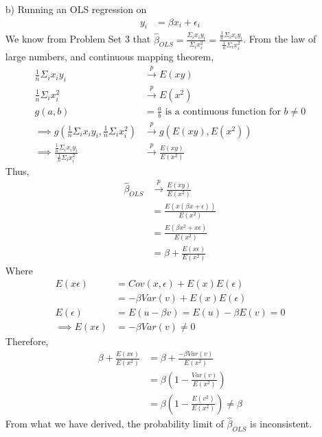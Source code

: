 \documentclass[
]{article}
\begin{document}
\begin{enumerate}
\item[b)]  
Running an OLS regression on 
$$\begin{aligned}
y_i &= \beta x_i + \epsilon_i
\end{aligned}$$
We know from Problem Set 3 that $\hat{\beta}_{OLS} = \frac{\Sigma_i x_i y_i}{\Sigma_i x_i^2} = \frac{\frac{1}{n}\Sigma_i x_i y_i}{\frac{1}{n}\Sigma_i x_i^2}$. 
From the law of large numbers, and continuous mapping theorem, 
\[\begin{aligned}
\frac{1}{n}\Sigma_i x_i y_i &\stackrel{p}\to E(xy) \\
\frac{1}{n}\Sigma_i x_i^2  &\stackrel{p}\to E(x^2) \\
g(a, b) &= \frac{a}{b} \text{ is a continuous function for $b \ne 0$} \\
\implies g(\frac{1}{n}\Sigma_i x_i y_i,\frac{1}{n}\Sigma_i x_i^2)  &\stackrel{p}\to 
g (E(xy) , E(x^2))\\
\implies \frac{\frac{1}{n}\Sigma_i x_i y_i}{\frac{1}{n}\Sigma_i x_i^2} 
&\stackrel{p}\to
\frac{E(xy)}{E(x^2)}
\end{aligned} \]
Thus,
$$\begin{aligned}
\hat{\beta}_{OLS} &\stackrel{p}\to \frac{E(xy)}{E(x^2)} \\
&=\frac{E(x(\beta x + \epsilon))}{E(x^2)} \\
&=\frac{E(\beta x^2 + x\epsilon)}{E(x^2)} \\
&= \beta + \frac{E(x\epsilon)}{E(x^2)}
\end{aligned}$$
Where 
\[\begin{aligned}
E(x \epsilon) &= Cov(x, \epsilon) + E(x)E(\epsilon)\\
&= -\beta Var(v) + E(x)E(\epsilon) \\
E(\epsilon) &= E(u - \beta v) = E(u) - \beta E(v) = 0 \\
\implies E(x \epsilon)&= -\beta Var(v) \ne 0
\end{aligned}\]
Therefore, 
\[\begin{aligned}
\beta + \frac{E(x\epsilon)}{E(x^2)}&=\beta + \frac{-\beta Var(v)}{E(x^2)} \\
&= \beta(1-\frac{Var(v)}{E(x^2)}) \\
&= \beta(1-\frac{E(v^2)}{E(x^2)}) \ne \beta
\end{aligned}\]
From what we have derived, the probability limit of $\hat{\beta}_{OLS}$ is inconsistent.


\end{enumerate}
\end{document}
